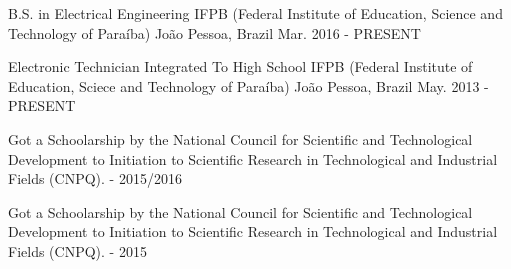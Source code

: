 

\begin{cventries}

  \cventry
    {B.S. in Electrical Engineering} %
    {IFPB (Federal Institute of Education, Science and Technology of Paraíba)} %
    {João Pessoa, Brazil} %
    {Mar. 2016 - PRESENT} %
    {
      \begin{cvitems} %
      \end{cvitems}
    }
    
    \cventry
    {Electronic Technician Integrated To High School} %
    {IFPB (Federal Institute of Education, Sciece and Technology of Paraíba)} %
    {João Pessoa, Brazil} %
    {May. 2013 - PRESENT} %
    {
		\begin{cvitems} %
        \item {Got a Schoolarship by the National Council for Scientific and Technological Development to Initiation to Scientific Research in Technological and Industrial Fields (CNPQ). - 2015/2016}  
		\item {Got a Schoolarship by the National Council for Scientific and Technological Development to Initiation to Scientific Research in Technological and Industrial Fields (CNPQ). - 2015}  
       \end{cvitems} 
    }

\end{cventries}
